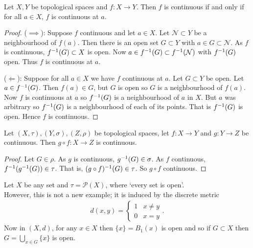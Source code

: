 \begin{proposition} \label{prp:27}
Let $X,Y$ be topological spaces and $f: X \to Y$. Then $f$ is continuous if and only if for all $a\in X$, $f$ is continuous at $a$.
\end{proposition}      

\begin{proof}
($\implies$): Suppose $f$ continuous and let $a\in X$. Let $\mathcal{N}\subset Y$ be a neighbourhood of $f(a)$.
Then there is an open set $G\subset Y$ with $a\in G\subset \mathcal{N}$.
As $f$ is continuous, $f^{-1}(G)\subset X$ is open.
Now $a\in f^{-1}(G) \subset f^{-1}(\mathcal{N})$ with $f^{-1}(G)$ open. Thus $f$ is continuous at $a$.

($\Longleftarrow$): Suppose for all $a \in X$ we have $f$ continuous at $a$.
Let $G\subset Y$ be open.
Let $a \in f^{-1}(G)$.
Then $f(a) \in G$, but $G$ is open so $G$ is a neighbourhood of $f(a)$.
Now $f$ is continuous at $a$ so $f^{-1}(G)$ is a neighbourhood of $a$ in $X$.
But $a$ was arbitrary so $f^{-1}(G)$ is a neighbourhood of each of its points.
That is $f^{-1}(G)$ is open.
Hence $f$ is continuous.
\end{proof}

\begin{proposition} \label{prp:28}
Let $(X,\tau), (Y,\sigma), (Z,\rho)$ be topological spaces, let $f:X \to Y$ and $g:Y \to Z$ be continuous. Then $g\circ f: X \to Z$ is continuous.
\end{proposition}

\begin{proof}
Let $G\in \rho$. As $g$ is continuous, $g^{-1}(G)\in \sigma$. As $f$ continuous, $f^{-1}(g^{-1}(G))\in \tau$. That is, $(g\circ f)^{-1}(G)\in \tau$. So $g\circ f$ continuous.
\end{proof}

\begin{example}
    Let $X$ be any set and $\tau = \mathcal{P}(X)$, where `every set is open'. \\
    However, this is not a new example; it is induced by the discrete metric \begin{align*}
        d(x, y) = \begin{cases}
            1 & x \neq y \\
            0 & x = y
        \end{cases}. 
    \end{align*} 
    Now in $(X,d)$, for any $x\in X$ then $\{x\} = B_1(x)$ is open and so if $G\subset X$ then $G = \bigcup_{x\in G} \{x\}$ is open.
\end{example}

